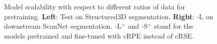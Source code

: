 \documentclass[10pt,twocolumn,letterpaper]{article}
\begin{document}
\begin{figure}[t]

    \caption{Model scalability with respect to different ratios of data for pretraining. \textbf{Left}: Test on Structured3D segmentation. \textbf{Right}: \SST-L on downstream ScanNet segmentation. \SST-L$^+$ and \SST-S$^+$ stand for the models pretrained and fine-tuned with cRPE instead of cRSE.}
    \label{fig:modelscale} \end{figure}
\end{document}
